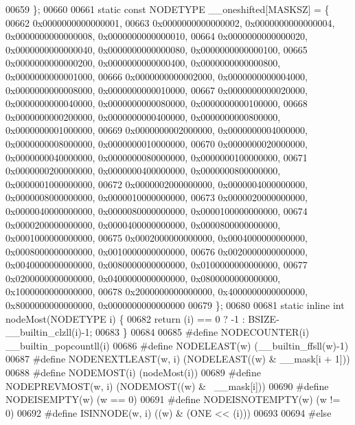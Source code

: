 \begin{DoxyCode}
00659 \};
00660 
00661 \textcolor{keyword}{static} \textcolor{keyword}{const} NODETYPE \_\_oneshifted[MASKSZ] = \{
00662         0x0000000000000001,
00663         0x0000000000000002, 0x0000000000000004, 0x0000000000000008, 0x0000000000000010,
00664         0x0000000000000020, 0x0000000000000040, 0x0000000000000080, 0x0000000000000100,
00665         0x0000000000000200, 0x0000000000000400, 0x0000000000000800, 0x0000000000001000,
00666         0x0000000000002000, 0x0000000000004000, 0x0000000000008000, 0x0000000000010000,
00667         0x0000000000020000, 0x0000000000040000, 0x0000000000080000, 0x0000000000100000,
00668         0x0000000000200000, 0x0000000000400000, 0x0000000000800000, 0x0000000001000000,
00669         0x0000000002000000, 0x0000000004000000, 0x0000000008000000, 0x0000000010000000,
00670         0x0000000020000000, 0x0000000040000000, 0x0000000080000000, 0x0000000100000000,
00671         0x0000000200000000, 0x0000000400000000, 0x0000000800000000, 0x0000001000000000,
00672         0x0000002000000000, 0x0000004000000000, 0x0000008000000000, 0x0000010000000000,
00673         0x0000020000000000, 0x0000040000000000, 0x0000080000000000, 0x0000100000000000,
00674         0x0000200000000000, 0x0000400000000000, 0x0000800000000000, 0x0001000000000000,
00675         0x0002000000000000, 0x0004000000000000, 0x0008000000000000, 0x0010000000000000,
00676         0x0020000000000000, 0x0040000000000000, 0x0080000000000000, 0x0100000000000000,
00677         0x0200000000000000, 0x0400000000000000, 0x0800000000000000, 0x1000000000000000,
00678         0x2000000000000000, 0x4000000000000000, 0x8000000000000000, 0x0000000000000000
00679 \};
00680 
00681 \textcolor{keyword}{static} \textcolor{keyword}{inline} \textcolor{keywordtype}{int} nodeMost(NODETYPE i) \{
00682         \textcolor{keywordflow}{return} (i) == 0 ? -1 : BSIZE-\_\_builtin\_clzll(i)-1;
00683 \}
00684 
00685 \textcolor{preprocessor}{#define NODECOUNTER(i) \_\_builtin\_popcountll(i)}
00686 \textcolor{preprocessor}{#define NODELEAST(w) (\_\_builtin\_ffsll(w)-1)}
00687 \textcolor{preprocessor}{#define NODENEXTLEAST(w, i) (NODELEAST((w) & \_\_mask[i + 1]))}
00688 \textcolor{preprocessor}{#define NODEMOST(i) (nodeMost(i))}
00689 \textcolor{preprocessor}{#define NODEPREVMOST(w, i) (NODEMOST((w) & ~\_\_mask[i]))}
00690 \textcolor{preprocessor}{#define NODEISEMPTY(w) (w == 0)}
00691 \textcolor{preprocessor}{#define NODEISNOTEMPTY(w) (w != 0)}
00692 \textcolor{preprocessor}{#define ISINNODE(w, i) ((w) & (ONE << (i)))                                                     }
00693 \textcolor{preprocessor}{}
00694 \textcolor{preprocessor}{#else}

\end{DoxyCode}
